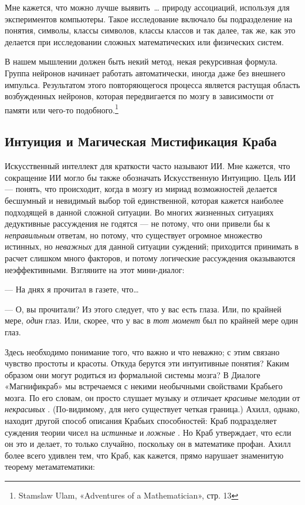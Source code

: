\documentclass[../main.tex]{subfiles}
\begin{document}
Мне кажется, что можно лучше выявить~\ldots{} природу ассоциаций, используя для экспериментов компьютеры. Такое исследование включало бы подразделение на понятия, символы, классы символов, классы классов и так далее, так же, как это делается при исследовании сложных математических или физических систем.

В нашем мышлении должен быть некий метод, некая рекурсивная формула. Группа нейронов начинает работать автоматически, иногда даже без внешнего импульса. Результатом этого повторяющегося процесса является растущая область возбужденных нейронов, которая передвигается по мозгу в зависимости от памяти или чего-то подобного.\footnote{Stamslaw Ulam, «Adventures of a Mathematician», стр. 13}


\subsection{Интуиция и Магическая Мистификация Краба}

Искусственный интеллект для краткости часто называют ИИ. Мне кажется, что сокращение ИИ могло бы также обозначать Искусственную Интуицию. Цель ИИ --- понять, что происходит, когда в мозгу из мириад возможностей делается бесшумный и невидимый выбор той единственной, которая кажется наиболее подходящей в данной сложной ситуации. Во многих жизненных ситуациях дедуктивные рассуждения не годятся --- не потому, что они привели бы к \emph{неправильным} ответам, но потому, что существует огромное множество истинных, но \emph{неважных} для данной ситуации суждений; приходится принимать в расчет слишком много факторов, и потому логические рассуждения оказываются неэффективными. Взгляните на этот мини-диалог:

--- На днях я прочитал в газете, что\ldots{}

--- О, вы прочитали? Из этого следует, что у вас есть глаза. Или, по крайней мере, \emph{один} глаз. Или, скорее, что у вас в \emph{тот момент} был по крайней мере один глаз.

Здесь необходимо понимание того, что важно и что неважно; с этим связано чувство простоты и красоты. Откуда берутся эти интуитивные понятия? Каким образом они могут родиться из формальной системы мозга? В Диалоге «Магнификраб» мы встречаемся с некими необычными свойствами Крабьего мозга. По его словам, он просто слушает музыку и отличает \emph{красивые} мелодии от \emph{некрасивых} . (По-видимому, для него существует четкая граница.) Ахилл, однако, находит другой способ описания Крабьих способностей: Краб подразделяет суждения теории чисел на \emph{истинные} и \emph{ложные} . Но Краб утверждает, что если он это и делает, то только случайно, поскольку он в математике профан. Ахилл более всего удивлен тем, что Краб, как кажется, прямо нарушает знаменитую теорему метаматематики:
\end{document}
